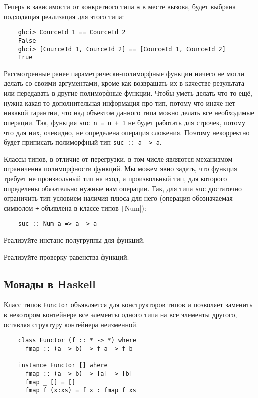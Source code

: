 Теперь в зависимости от конкретного типа \texttt{a} в месте вызова, будет выбрана подходящая реализация для этого типа:
\begin{verbatim}
    ghci> CourceId 1 == CourceId 2
    False
    ghci> [CourceId 1, CourceId 2] == [CourceId 1, CourceId 2]
    True
\end{verbatim}

Рассмотренные ранее параметрически-полиморфные функции ничего не могли делать со своими аргументами, кроме как возвращать их в качестве результата или передавать в другие полиморфные функции.
Чтобы уметь делать что-то ещё, нужна какая-то дополнительная информация про тип, потому что иначе нет никакой гарантии, что над объектом данного типа можно делать все необходимые операции.
Так, функция \texttt{suc n = n + 1} не будет работать для строчек, потому что для них, очевидно, не определена операция сложения.
Поэтому некорректно будет приписать полиморфный тип \texttt{suc :: a -> a}.

Классы типов, в отличие от перегрузки, в том числе являются механизмом ограничения полиморфности функций.
Мы можем явно задать, что функция требует не произвольный тип на вход, а произвольный тип, для которого определены обязательно нужные нам операции.
Так, для типа \texttt{suc} достаточно ограничить тип условием наличия плюса для него (операция обозначаемая символом \texttt{+} объявлена в классе типов \texttt|Num|):
\begin{verbatim}
    suc :: Num a => a -> a
\end{verbatim}

\begin{task}
    Реализуйте инстанс полугруппы для функций.
\end{task}

\begin{task}
    Реализуйте проверку равенства функций.
\end{task}

\subsection{Монады в Haskell}

Класс типов \texttt{Functor} объявляется для конструкторов типов и позволяет заменить в некотором контейнере все элементы одного типа на все элементы другого, оставляя структуру контейнера неизменной.

\begin{verbatim}
    class Functor (f :: * -> *) where
      fmap :: (a -> b) -> f a -> f b

    instance Functor [] where
      fmap :: (a -> b) -> [a] -> [b]
      fmap _ [] = []
      fmap f (x:xs) = f x : fmap f xs
\end{verbatim}

